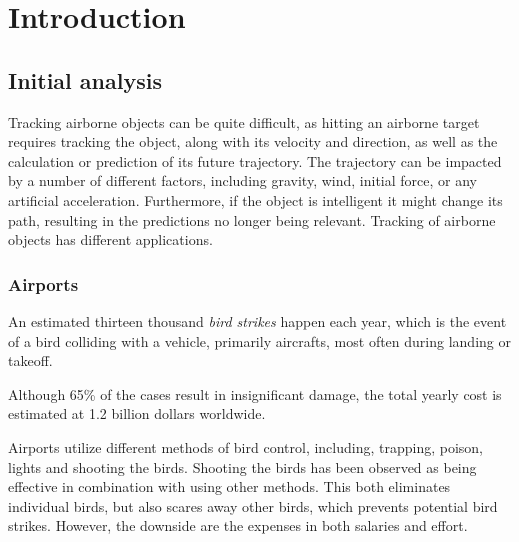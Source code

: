 \chapter{Introduction}
\section{Initial analysis}
Tracking airborne objects can be quite difficult, as hitting an airborne target requires tracking the object, along with its velocity and direction, as well as the calculation or prediction of its future trajectory.
The trajectory can be impacted by a number of different factors, including gravity, wind, initial force, or any artificial acceleration.
Furthermore, if the object is intelligent it might change its path, resulting in the predictions no longer being relevant.
Tracking of airborne objects has different applications.
\subsection{Airports}
An estimated thirteen thousand \textit{bird strikes} happen each year, which is the event of a bird colliding with a vehicle, primarily aircrafts\cite{WildlifeStrikeReport}, most often during landing or takeoff\cite{CostOfBirdstrikes}.

Although 65\% of the cases result in insignificant damage, the total yearly cost is estimated at 1.2 billion dollars worldwide\cite{CostOfBirdstrikes}.

Airports utilize different methods of bird control, including, trapping, poison, lights and shooting the birds\cite{BirdControlAtAirports}.
Shooting the birds has been observed as being effective in combination with using other methods.
This both eliminates individual birds, but also scares away other birds, which prevents potential bird strikes.
However, the downside are the expenses in both salaries and effort.


